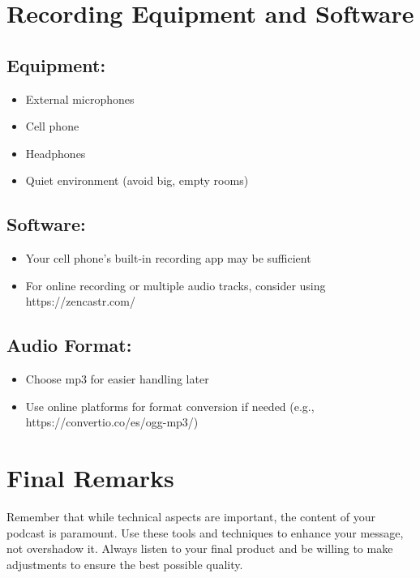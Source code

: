 \documentclass[
  letterpaper,
  DIV=11,
  numbers=noendperiod]{scrreprt}
\providecommand{\tightlist}{%
  \setlength{\itemsep}{0pt}\setlength{\parskip}{0pt}}\usepackage{longtable,booktabs,array}
\begin{document}
\section{Recording Equipment and
Software}\label{recording-equipment-and-software}

\subsection{Equipment:}\label{equipment}

\begin{itemize}
\tightlist
\item
  External microphones
\item
  Cell phone
\item
  Headphones
\item
  Quiet environment (avoid big, empty rooms)
\end{itemize}

\subsection{Software:}\label{software}

\begin{itemize}
\tightlist
\item
  Your cell phone's built-in recording app may be sufficient
\item
  For online recording or multiple audio tracks, consider using
  https://zencastr.com/
\end{itemize}

\subsection{Audio Format:}\label{audio-format}

\begin{itemize}
\tightlist
\item
  Choose mp3 for easier handling later
\item
  Use online platforms for format conversion if needed (e.g.,
  https://convertio.co/es/ogg-mp3/)
\end{itemize}

\section{Final Remarks}\label{final-remarks}

Remember that while technical aspects are important, the content of your
podcast is paramount. Use these tools and techniques to enhance your
message, not overshadow it. Always listen to your final product and be
willing to make adjustments to ensure the best possible quality.
\end{document}
